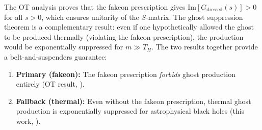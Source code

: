 \documentclass[11pt,a4paper]{article}
\newcommand{\Thr}{T_{\!\scriptscriptstyle H}}
\theoremstyle{plain}
\theoremstyle{definition}
\begin{document}
The OT analysis proves that the fakeon prescription gives
$\mathrm{Im}[G_{\mathrm{dressed}}(s)] > 0$ for all $s > 0$, which
ensures unitarity of the $S$-matrix.  The ghost suppression theorem
is a complementary result: even if one hypothetically allowed the
ghost to be produced thermally (violating the fakeon prescription),
the production would be exponentially suppressed for $m \gg \Thr$.
The two results together provide a belt-and-suspenders guarantee:
\begin{enumerate}[label=(\roman*)]
  \item \textbf{Primary (fakeon):} The fakeon prescription
    \emph{forbids} ghost production entirely (OT result,
    ).
  \item \textbf{Fallback (thermal):} Even without the fakeon
    prescription, thermal ghost production is exponentially
    suppressed for astrophysical black holes (this work,
    ).
\end{enumerate}
\end{document}
